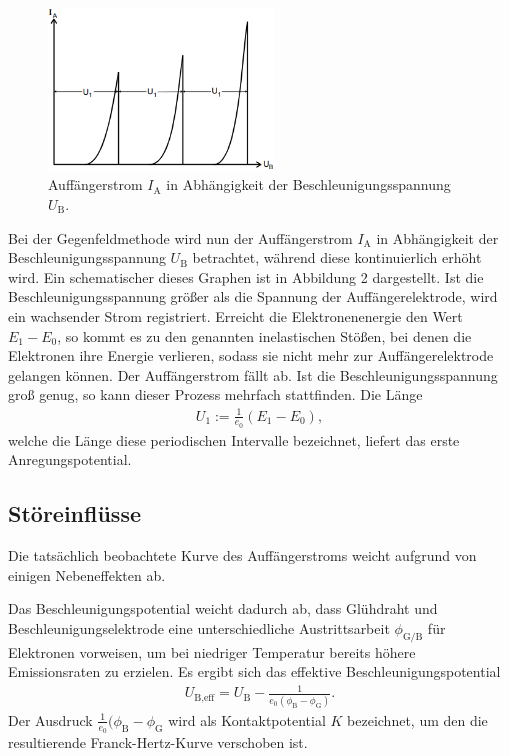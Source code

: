 \begin{figure}
  \includegraphics[width=6cm]{peaks.png}
  \caption{Auffängerstrom $I_\text{A}$ in Abhängigkeit der Beschleunigungsspannung $U_\text{B}$. \cite[S.118]{kent}}
\end{figure}
Bei der Gegenfeldmethode wird nun der Auffängerstrom $I_\text{A}$ in Abhängigkeit 
der Beschleunigungsspannung $U_\text{B}$ betrachtet, während diese kontinuierlich erhöht wird.
Ein schematischer dieses Graphen ist in Abbildung 2 dargestellt. Ist die Beschleunigungsspannung
größer als die Spannung der Auffängerelektrode, wird ein wachsender Strom registriert.
Erreicht die Elektronenenergie den Wert $E_\text{1} - E_\text{0}$, so kommt es zu den genannten
inelastischen Stößen, bei denen die Elektronen ihre Energie verlieren, sodass sie nicht mehr zur
Auffängerelektrode gelangen können. Der Auffängerstrom fällt ab. Ist die Beschleunigungsspannung
groß genug, so kann dieser Prozess mehrfach stattfinden. Die Länge 
\begin{align}
U_\text{1} := \frac{1}{e_\text{0}} (E_\text{1} - E_\text{0}),
\end{align} 
welche die Länge diese periodischen Intervalle bezeichnet, liefert das erste Anregungspotential.

\subsection{Störeinflüsse}
Die tatsächlich beobachtete Kurve des Auffängerstroms weicht aufgrund von einigen Nebeneffekten
ab.

Das Beschleunigungspotential weicht dadurch ab, dass Glühdraht und Beschleunigungselektrode
eine unterschiedliche Austrittsarbeit $\phi_\text{G/B}$ für Elektronen vorweisen, um bei niedriger Temperatur 
bereits höhere Emissionsraten zu erzielen. Es ergibt sich das effektive Beschleunigungspotential
\begin{align}
U_\text{B,eff} = U_\text{B} - \frac{1}{e_\text{0}(\phi_\text{B} - \phi_\text{G})}.
\end{align}
Der Ausdruck $\frac{1}{e_\text{0}}(\phi_\text{B}-\phi_\text{G}$ wird als Kontaktpotential $K$
bezeichnet, um den die resultierende Franck-Hertz-Kurve verschoben ist.

